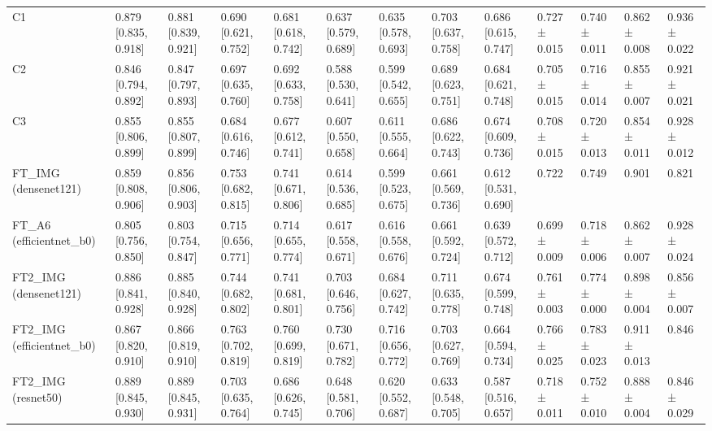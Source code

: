\begin{table}
\begin{tabular}{lllllllllllll}
C1 & 0.879 [0.835, 0.918] & 0.881 [0.839, 0.921] & 0.690 [0.621, 0.752] & 0.681 [0.618, 0.742] & 0.637 [0.579, 0.689] & 0.635 [0.578, 0.693] & 0.703 [0.637, 0.758] & 0.686 [0.615, 0.747] & 0.727 ± 0.015 & 0.740 ± 0.011 & 0.862 ± 0.008 & 0.936 ± 0.022 \\
C2 & 0.846 [0.794, 0.892] & 0.847 [0.797, 0.893] & 0.697 [0.635, 0.760] & 0.692 [0.633, 0.758] & 0.588 [0.530, 0.641] & 0.599 [0.542, 0.655] & 0.689 [0.623, 0.751] & 0.684 [0.621, 0.748] & 0.705 ± 0.015 & 0.716 ± 0.014 & 0.855 ± 0.007 & 0.921 ± 0.021 \\
C3 & 0.855 [0.806, 0.899] & 0.855 [0.807, 0.899] & 0.684 [0.616, 0.746] & 0.677 [0.612, 0.741] & 0.607 [0.550, 0.658] & 0.611 [0.555, 0.664] & 0.686 [0.622, 0.743] & 0.674 [0.609, 0.736] & 0.708 ± 0.015 & 0.720 ± 0.013 & 0.854 ± 0.011 & 0.928 ± 0.012 \\
FT\_IMG (densenet121) & 0.859 [0.808, 0.906] & 0.856 [0.806, 0.903] & 0.753 [0.682, 0.815] & 0.741 [0.671, 0.806] & 0.614 [0.536, 0.685] & 0.599 [0.523, 0.675] & 0.661 [0.569, 0.736] & 0.612 [0.531, 0.690] & 0.722 & 0.749 & 0.901 & 0.821 \\
FT\_A6 (efficientnet\_b0) & 0.805 [0.756, 0.850] & 0.803 [0.754, 0.847] & 0.715 [0.656, 0.771] & 0.714 [0.655, 0.774] & 0.617 [0.558, 0.671] & 0.616 [0.558, 0.676] & 0.661 [0.592, 0.724] & 0.639 [0.572, 0.712] & 0.699 ± 0.009 & 0.718 ± 0.006 & 0.862 ± 0.007 & 0.928 ± 0.024 \\
FT2\_IMG (densenet121) & 0.886 [0.841, 0.928] & 0.885 [0.840, 0.928] & 0.744 [0.682, 0.802] & 0.741 [0.681, 0.801] & 0.703 [0.646, 0.756] & 0.684 [0.627, 0.742] & 0.711 [0.635, 0.778] & 0.674 [0.599, 0.748] & 0.761 ± 0.003 & 0.774 ± 0.000 & 0.898 ± 0.004 & 0.856 ± 0.007 \\
FT2\_IMG (efficientnet\_b0) & 0.867 [0.820, 0.910] & 0.866 [0.819, 0.910] & 0.763 [0.702, 0.819] & 0.760 [0.699, 0.819] & 0.730 [0.671, 0.782] & 0.716 [0.656, 0.772] & 0.703 [0.627, 0.769] & 0.664 [0.594, 0.734] & 0.766 ± 0.025 & 0.783 ± 0.023 & 0.911 ± 0.013 & 0.846 \\
FT2\_IMG (resnet50) & 0.889 [0.845, 0.930] & 0.889 [0.845, 0.931] & 0.703 [0.635, 0.764] & 0.686 [0.626, 0.745] & 0.648 [0.581, 0.706] & 0.620 [0.552, 0.687] & 0.633 [0.548, 0.705] & 0.587 [0.516, 0.657] & 0.718 ± 0.011 & 0.752 ± 0.010 & 0.888 ± 0.004 & 0.846 ± 0.029 \\
\bottomrule
\end{tabular}
\end{table}
